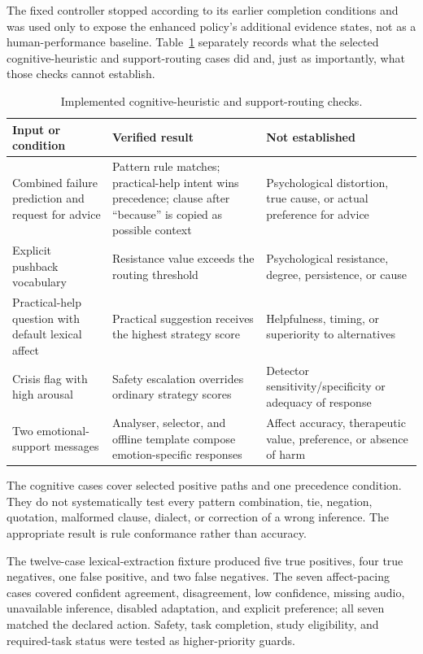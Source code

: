 The fixed controller stopped according to its earlier completion conditions and was used only to expose the enhanced policy's additional evidence states, not as a human-performance baseline. Table~\ref{tab:cognitive-routing-cases} separately records what the selected cognitive-heuristic and support-routing cases did and, just as importantly, what those checks cannot establish.

\begin{table}[htbp]
\centering
\caption{Implemented cognitive-heuristic and support-routing checks.}
\label{tab:cognitive-routing-cases}
\footnotesize
\begin{tabularx}{\textwidth}{|>{\raggedright\arraybackslash}p{}|>{\raggedright\arraybackslash}p{}|X|}
\hline
\textbf{Input or condition} & \textbf{Verified result} & \textbf{Not established} \\ \hline
Combined failure prediction and request for advice & Pattern rule matches; practical-help intent wins precedence; clause after ``because'' is copied as possible context & Psychological distortion, true cause, or actual preference for advice \\ \hline
Explicit pushback vocabulary & Resistance value exceeds the routing threshold & Psychological resistance, degree, persistence, or cause \\ \hline
Practical-help question with default lexical affect & Practical suggestion receives the highest strategy score & Helpfulness, timing, or superiority to alternatives \\ \hline
Crisis flag with high arousal & Safety escalation overrides ordinary strategy scores & Detector sensitivity/specificity or adequacy of response \\ \hline
Two emotional-support messages & Analyser, selector, and offline template compose emotion-specific responses & Affect accuracy, therapeutic value, preference, or absence of harm \\ \hline
\end{tabularx}
\end{table}

The cognitive cases cover selected positive paths and one precedence condition. They do not systematically test every pattern combination, tie, negation, quotation, malformed clause, dialect, or correction of a wrong inference. The appropriate result is rule conformance rather than accuracy.

The twelve-case lexical-extraction fixture produced five true positives, four true negatives, one false positive, and two false negatives. The seven affect-pacing cases covered confident agreement, disagreement, low confidence, missing audio, unavailable inference, disabled adaptation, and explicit preference; all seven matched the declared action. Safety, task completion, study eligibility, and required-task status were tested as higher-priority guards.

